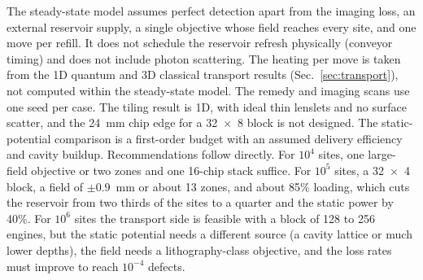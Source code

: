 The steady-state model assumes perfect detection apart from the imaging loss, an external reservoir supply, a single objective whose field reaches every site, and one move per refill. It does not schedule the reservoir refresh physically (conveyor timing) and does not include photon scattering. The heating per move is taken from the 1D quantum and 3D classical transport results (Sec.~\ref{sec:transport}), not computed within the steady-state model. The remedy and imaging scans use one seed per case. The tiling result is 1D, with ideal thin lenslets and no surface scatter, and the 24~mm chip edge for a 32~$\times$~8 block is not designed. The static-potential comparison is a first-order budget with an assumed delivery efficiency and cavity buildup. Recommendations follow directly. For $10^4$ sites, one large-field objective or two zones and one 16-chip stack suffice. For $10^5$ sites, a 32~$\times$~4 block, a field of $\pm0.9$~mm or about 13 zones, and about 85\% loading, which cuts the reservoir from two thirds of the sites to a quarter and the static power by 40\%. For $10^6$ sites the transport side is feasible with a block of 128 to 256 engines, but the static potential needs a different source (a cavity lattice or much lower depths), the field needs a lithography-class objective, and the loss rates must improve to reach $10^{-4}$ defects.

